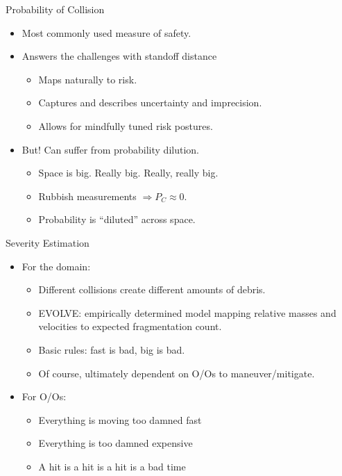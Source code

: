 \documentclass[pdf]{beamer}
\begin{document}
\begin{frame}{Probability of Collision}
  \begin{itemize}
  \item Most commonly used measure of safety.

  \item Answers the challenges with standoff distance
    \begin{itemize}
    \item Maps naturally to risk.
    \item Captures and describes uncertainty and imprecision.
    \item Allows for mindfully tuned risk postures.
    \end{itemize}

  \item But! Can suffer from probability dilution.
    \begin{itemize}
    \item Space is big. Really big. Really, really big.
    \item Rubbish measurements $\Rightarrow P_C \approx 0$.
    \item Probability is ``diluted'' across space.
    \end{itemize}
  \end{itemize}
\end{frame}

\begin{frame}{Severity Estimation}
  \begin{itemize}
  \item For the domain:
    \begin{itemize}
    \item Different collisions create different amounts of debris.
    \item EVOLVE: empirically determined model mapping relative masses and
      velocities to expected fragmentation count.
    \item Basic rules: fast is bad, big is bad.
    \item Of course, ultimately dependent on O/Os to maneuver/mitigate.
    \end{itemize}

  \item For O/Os:
    \begin{itemize}
    \item Everything is moving too damned fast
    \item Everything is too damned expensive
    \item A hit is a hit is a hit is a bad time
    \end{itemize}
  \end{itemize}
\end{frame}
\end{document}
